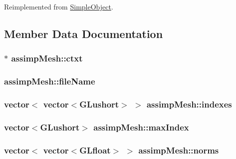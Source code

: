 Reimplemented from \hyperlink{class_simple_object_a7523273ddea5901d2049575229c8b5ca}{Simple\-Object}.



\subsection{Member Data Documentation}
\hypertarget{classassimp_mesh_a02d771465184fd290ac9cc4b38b32828}{
\subsubsection[{ctxt}]{$\ast$ assimp\-Mesh\-::ctxt}}\label{classassimp_mesh_a02d771465184fd290ac9cc4b38b32828}
\hypertarget{classassimp_mesh_ab3e634962612b237a956fd8128f70c84}{
\subsubsection[{file\-Name}]{ assimp\-Mesh\-::file\-Name}}\label{classassimp_mesh_ab3e634962612b237a956fd8128f70c84}
\hypertarget{classassimp_mesh_a488c709de58bc05a6c1748a379d29109}{
\subsubsection[{indexes}]{\setlength{\rightskip}{0pt plus 5cm}vector$<$ vector$<${\bf G\-Lushort}$>$ $>$ assimp\-Mesh\-::indexes}}\label{classassimp_mesh_a488c709de58bc05a6c1748a379d29109}
\hypertarget{classassimp_mesh_a103119ca657355e47e36a88802fa485a}{
\subsubsection[{max\-Index}]{\setlength{\rightskip}{0pt plus 5cm}vector$<${\bf G\-Lushort}$>$ assimp\-Mesh\-::max\-Index}}\label{classassimp_mesh_a103119ca657355e47e36a88802fa485a}
\hypertarget{classassimp_mesh_a71635c933787e2acfce8bfdfe60fb958}{
\subsubsection[{norms}]{\setlength{\rightskip}{0pt plus 5cm}vector$<$ vector$<${\bf G\-Lfloat}$>$ $>$ assimp\-Mesh\-::norms}}\label{classassimp_mesh_a71635c933787e2acfce8bfdfe60fb958}
